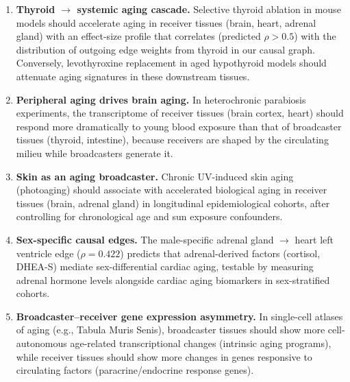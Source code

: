 \documentclass[11pt,a4paper]{article}
\begin{document}
\begin{enumerate}[leftmargin=*]
\item \textbf{Thyroid $\to$ systemic aging cascade.} Selective thyroid ablation in mouse models should accelerate aging in receiver tissues (brain, heart, adrenal gland) with an effect-size profile that correlates (predicted $\rho > 0.5$) with the distribution of outgoing edge weights from thyroid in our causal graph. Conversely, levothyroxine replacement in aged hypothyroid models should attenuate aging signatures in these downstream tissues.

\item \textbf{Peripheral aging drives brain aging.} In heterochronic parabiosis experiments, the transcriptome of receiver tissues (brain cortex, heart) should respond more dramatically to young blood exposure than that of broadcaster tissues (thyroid, intestine), because receivers are shaped by the circulating milieu while broadcasters generate it.

\item \textbf{Skin as an aging broadcaster.} Chronic UV-induced skin aging (photoaging) should associate with accelerated biological aging in receiver tissues (brain, adrenal gland) in longitudinal epidemiological cohorts, after controlling for chronological age and sun exposure confounders.

\item \textbf{Sex-specific causal edges.} The male-specific adrenal gland $\to$ heart left ventricle edge ($\rho = 0.422$) predicts that adrenal-derived factors (cortisol, DHEA-S) mediate sex-differential cardiac aging, testable by measuring adrenal hormone levels alongside cardiac aging biomarkers in sex-stratified cohorts.

\item \textbf{Broadcaster--receiver gene expression asymmetry.} In single-cell atlases of aging (e.g., Tabula Muris Senis), broadcaster tissues should show more cell-autonomous age-related transcriptional changes (intrinsic aging programs), while receiver tissues should show more changes in genes responsive to circulating factors (paracrine/endocrine response genes).
\end{enumerate}
\end{document}
